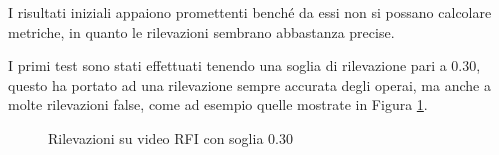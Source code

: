 I risultati iniziali appaiono promettenti benché da essi non si possano calcolare metriche, in quanto le rilevazioni sembrano abbastanza precise. 

I primi test sono stati effettuati tenendo una soglia di rilevazione pari a $0.30$, questo ha portato ad una rilevazione sempre accurata degli operai, ma anche a molte rilevazioni false, come ad esempio quelle mostrate in Figura \ref{fig:rfi_030}. 

\begin{figure}[]
    \begin{minipage}{.5\linewidth}
        \centering
    \end{minipage}%
    \begin{minipage}{.5\linewidth}
        \centering
    \end{minipage}
    \centering
    \caption{Rilevazioni su video RFI con soglia 0.30}
    \label{fig:rfi_030}
\end{figure}


